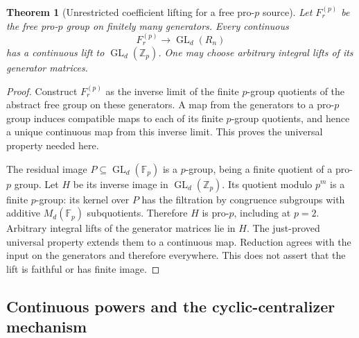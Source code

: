 \documentclass[11pt]{article}
\newtheorem{theorem}{Theorem}[section]
\theoremstyle{definition}
\theoremstyle{remark}
\begin{document}
\begin{theorem}[Unrestricted coefficient lifting for a free pro-$p$ source]\label{thm:free-pro-p-lift}
Let $F_r^{(p)}$ be the free pro-$p$ group on finitely many generators. Every continuous
\[
 F_r^{(p)}\longrightarrow\operatorname{GL}_d(R_n)
\]
has a continuous lift to $\operatorname{GL}_d(\mathbb Z_p)$. One may choose arbitrary integral lifts of its generator matrices.
\end{theorem}
\begin{proof}
Construct $F_r^{(p)}$ as the inverse limit of the finite $p$-group quotients of the abstract free group on these generators. A map from the generators to a pro-$p$ group induces compatible maps to each of its finite $p$-group quotients, and hence a unique continuous map from this inverse limit. This proves the universal property needed here.

The residual image $P\subseteq\operatorname{GL}_d(\mathbb F_p)$ is a $p$-group, being a finite quotient of a pro-$p$ group. Let $H$ be its inverse image in $\operatorname{GL}_d(\mathbb Z_p)$. Its quotient modulo $p^m$ is a finite $p$-group: its kernel over $P$ has the filtration by congruence subgroups with additive $M_d(\mathbb F_p)$ subquotients. Therefore $H$ is pro-$p$, including at $p=2$. Arbitrary integral lifts of the generator matrices lie in $H$. The just-proved universal property extends them to a continuous map. Reduction agrees with the input on the generators and therefore everywhere. This does not assert that the lift is faithful or has finite image.
\end{proof}

\subsection{Continuous powers and the cyclic-centralizer mechanism}
\end{document}
